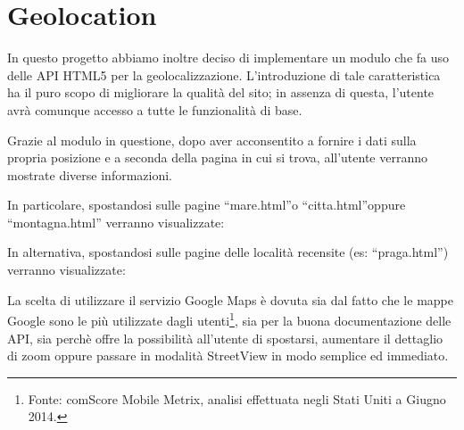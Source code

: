 \section{Geolocation}
In questo progetto abbiamo inoltre deciso di implementare un modulo che fa uso delle API HTML5 per la geolocalizzazione. L'introduzione di tale caratteristica ha il puro scopo di migliorare la qualità del sito; in assenza di questa, l'utente avrà comunque accesso a tutte le funzionalità di base.
\begin{flushleft}
Grazie al modulo in questione, dopo aver acconsentito a fornire i dati sulla propria posizione e a seconda della pagina in cui si trova, all'utente verranno mostrate diverse informazioni.
\end{flushleft}

\begin{flushleft}
In particolare, spostandosi sulle pagine “mare.html”o “citta.html”oppure “montagna.html” verranno visualizzate:
\end{flushleft}

\begin{flushleft}
In alternativa, spostandosi sulle pagine delle località recensite (es: “praga.html”) verranno visualizzate:
La scelta di utilizzare il servizio Google Maps è dovuta sia dal fatto che le mappe Google sono le più utilizzate dagli utenti\footnote{ Fonte: comScore Mobile Metrix, analisi effettuata negli Stati Uniti a Giugno 2014.
}, sia per la buona documentazione delle API, sia perchè offre la possibilità all'utente di spostarsi, aumentare il dettaglio di zoom oppure passare in modalità StreetView in modo semplice ed immediato.
\end{flushleft}

